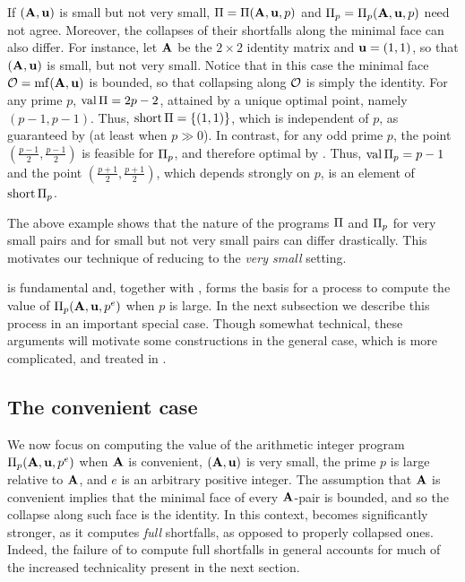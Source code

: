 \documentclass{article}
\begin{document}
\begin{example}
   If $(\mathbf{A}, \mathbf{u})$ is small but not very small, $\Pi = \Pi(\mathbf{A},\mathbf{u},p)$ and $\Pi_p = \Pi_p(\mathbf{A},\mathbf{u},p)$ need not agree.
   Moreover, the collapses of their shortfalls along the minimal face can also differ.
   For instance, let $\mathbf{A}$ be the $2 \times 2$ identity matrix and $\mathbf{u} = (1,1)$, so that $(\mathbf{A},\mathbf{u})$ is small, but not very small.
   Notice that in this case the minimal face $\mathcal{O} = \operatorname{mf}(\mathbf{A},\mathbf{u})$ is bounded, so that collapsing along $\mathcal{O}$ is simply the identity.
   For any prime $p$, $\operatorname{val} \Pi = 2p - 2$, attained by a unique optimal point, namely $(p-1,p-1)$.
   Thus, $\operatorname{short} \Pi = \{(1,1)\}$, which is independent of $p$, as guaranteed by   (at least when $p \gg 0$).
   In contrast, for any odd prime $p$, the point $(\frac{p-1}{2}, \frac{p-1}{2})$ is feasible for $\Pi_p$, and therefore optimal by .
   Thus, $\operatorname{val} \Pi_p = p-1$ and the point $(\frac{p+1}{2}, \frac{p+1}{2})$, which depends strongly on $p$, is an element of $\operatorname{short} \Pi_p$.
\end{example}

The above example shows that the nature of the programs $\Pi$ and $\Pi_p$ for very small pairs and for small but not very small pairs can differ drastically.
This motivates our technique of reducing to the \emph{very small} setting.

 is fundamental and, together with , forms the basis for a process to compute the value of $\Pi_p(\mathbf{A}, \mathbf{u}, p^e)$ when $p$ is large.  
In the next subsection we describe this process in an important special case.  Though somewhat technical, these arguments will motivate some constructions in the general case, which is more complicated, and treated in .

\subsection{The convenient case}
\label{convenient: SS}

We now focus on computing the value of the arithmetic integer program $\Pi_p(\mathbf{A},\mathbf{u}, p^e)$ when $\mathbf{A}$ is convenient, $(\mathbf{A},\mathbf{u})$ is very small, the prime $p$ is large relative to $\mathbf{A}$, and $e$ is an arbitrary positive integer.
The assumption that $\mathbf{A}$ is convenient implies that the minimal face of every $\mathbf{A}$-pair is bounded, and so the collapse along such face is the identity.
In this context,  becomes significantly stronger, as it computes \emph{full} shortfalls, as opposed to properly collapsed ones.
Indeed, the failure of  to compute full shortfalls in general accounts for much of the increased technicality present in the next section.
\end{document}
